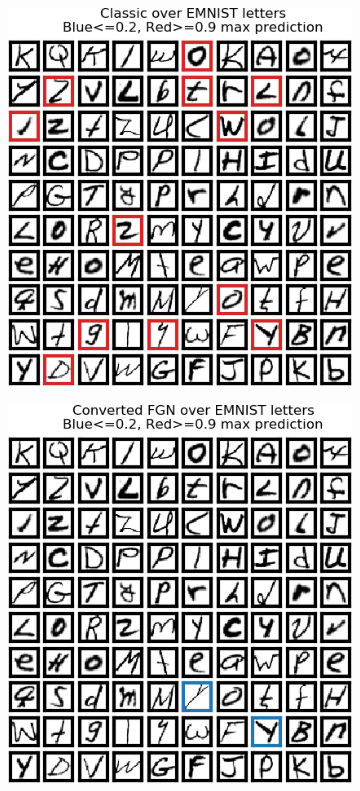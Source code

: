\documentclass[12pt,oneside]{CUNY_PhD}
\begin{document}
\begin{figure}[!htbp]
    \centering
    \begin{subfigure}[t]{0.32\textwidth}
        \includegraphics[width=\textwidth]{images/Letters/classic-letters.png}
    \end{subfigure}
    \begin{subfigure}[t]{0.32\textwidth}
        \includegraphics[width=\textwidth]{images/Letters/converted-letters.png}

\end{subfigure}
\end{figure}
\end{document}
